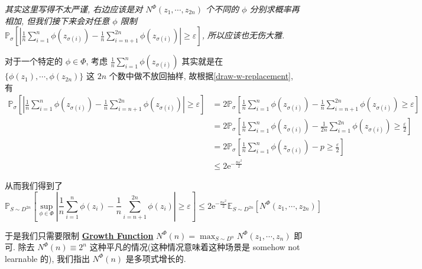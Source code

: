 \documentclass[8pt]{article}
\theoremstyle{compact}
\def\obj#1{\textbf{\uline{#1}}}
\def\le{\leqslant}
\def\ge{\geqslant}
\def\e{\mathrm{e}}
\begin{document}
\textit{其实这里写得不太严谨, 右边应该是对 $N^{\Phi}(z_1, \cdots, z_{2n})$ 个不同的 $\phi$ 分别求概率再相加, 但我们接下来会对任意 $\phi$ 限制 $\mathbb P_{\sigma}\left[\left|\frac1n\sum\limits_{i=1}^{n}\phi(z_{\sigma(i)}) - \frac1n\sum\limits_{i=n+1}^{2n}\phi(z_{\sigma(i)})\right| \ge \varepsilon\right]$, 所以应该也无伤大雅.}

对于一个特定的 $\phi \in \Phi$, 考虑 $\frac1n\sum\limits_{i=1}^{n}\phi(z_{\sigma(i)})$ 其实就是在 $\{\phi(z_1), \cdots, \phi(z_{2n})\}$ 这 $2n$ 个数中做不放回抽样, 故根据\cref{draw-w-replacement}, 有 \begin{equation*}
	\begin{split}
		\mathbb P_{\sigma}\left[\left|\frac1n\sum\limits_{i=1}^{n}\phi(z_{\sigma(i)}) - \frac1n\sum\limits_{i=n+1}^{2n}\phi(z_{\sigma(i)})\right| \ge \varepsilon\right]
		&=2\mathbb P_{\sigma}\left[\frac1n\sum\limits_{i=1}^{n}\phi(z_{\sigma(i)}) - \frac1n\sum\limits_{i=n+1}^{2n}\phi(z_{\sigma(i)}) \ge \varepsilon\right]\\
		&=2\mathbb P_{\sigma}\left[\frac1n\sum\limits_{i=1}^{n}\phi(z_{\sigma(i)}) - \frac1{2n}\sum\limits_{i=1}^{2n}\phi(z_{\sigma(i)}) \ge \frac{\varepsilon}{2}\right]\\
		&=2\mathbb P_{\sigma}\left[\frac1n\sum\limits_{i=1}^{n}\phi(z_{\sigma(i)}) - p \ge \frac{\varepsilon}{2}\right]\\
		&\le 2\e^{-\frac{n\varepsilon^2}{2}}
	\end{split}
\end{equation*}

从而我们得到了 $$\mathbb P_{S \sim D^{2n}}\left[\sup_{\phi \in \Phi}\left|\frac1n\sum_{i=1}^{n}\phi(z_i) - \frac1n\sum_{i=n+1}^{2n}\phi(z_i)\right| \ge \varepsilon\right] \le 2\e^{-\frac{n\varepsilon^2}{2}}\mathbb E_{S \sim D^{2n}}\left[N^{\Phi}(z_1, \cdots, z_{2n})\right]$$

于是我们只需要限制 \obj{Growth Function} $N^{\Phi}(n) = \max_{S \sim D^n}N^{\Phi}(z_1, \cdots, z_n)$ 即可. 除去 $N^{\Phi}(n) \equiv 2^n$ 这种平凡的情况(这种情况意味着这种场景是 somehow not learnable 的), 我们指出 $N^{\Phi}(n)$ 是多项式增长的.
\end{document}
